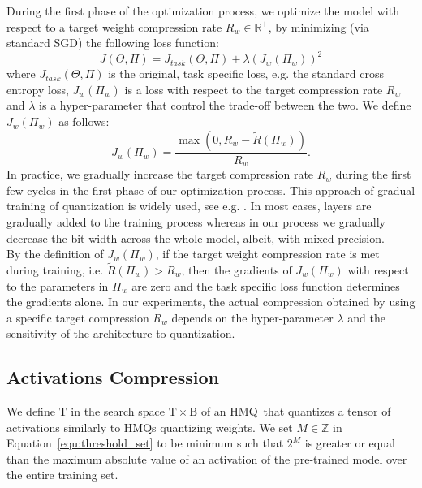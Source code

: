 \documentclass{article}
\newcommand{\bitset}{\mathrm{B}}
\newcommand{\threshset}{\mathrm{T}}
\newcommand{\qb}{HMQ}
\begin{document}
During the first phase of the optimization process, we optimize the model with respect to a target weight compression rate $R_w\in\mathbb{R^+}$, by minimizing (via standard SGD) the following loss function:
\begin{equation}\label{equ:loss}
J(\Theta,\Pi)=J_{task}(\Theta,\Pi)+\lambda \left(J_w(\Pi_w)\right)^{2}
\end{equation}
where $J_{task}(\Theta,\Pi)$ is the original, task specific loss, e.g. the standard cross entropy loss, $J_w(\Pi_w)$ is a loss with respect to the target compression rate $R_w$ and $\lambda$ is a hyper-parameter that control the trade-off between the two.
We define $J_{w}(\Pi_w)$ as follows:
\begin{equation}\label{equ:J_req}
J_{w}(\Pi_w)=\frac{\max(0, R_w-\tilde{R}(\Pi_w))}{R_w}.
\end{equation}
In practice, we gradually increase the target compression rate $R_w$ during the first few cycles in the first phase of our optimization process. 
This approach of gradual training of quantization is widely used, see e.g. \cite{baskin2018nice,dong2017learning,dong2019hawq,zhou2017incremental}.
In most cases, layers are gradually added to the training process whereas in our process we gradually decrease the bit-width across the whole model, albeit, with mixed precision.\\

By the definition of $J_{w}(\Pi_w)$, if the target weight compression rate is met during training, i.e. $\tilde{R}(\Pi_w) > R_w$, then the gradients of $J_{w}(\Pi_w)$ with respect to the parameters in $\Pi_w$ are zero and the task specific loss function determines the gradients alone. 
In our experiments, the actual compression obtained by using a specific target compression $R_w$ depends on the hyper-parameter $\lambda$ and the sensitivity of the architecture to quantization.




\subsection{Activations Compression}\label{subsec:activations_compression}
We define $\threshset$ in the search space $\threshset\times \bitset$ of an \qb\ that quantizes a tensor of activations similarly to \qb s quantizing weights.
We set $M\in\mathbb{Z}$ in \mbox{Equation \ref{equ:threshold_set}} to be minimum such that $2^M$ is greater or equal than the maximum absolute value of an activation of the pre-trained model over the entire training set.\\
\end{document}
